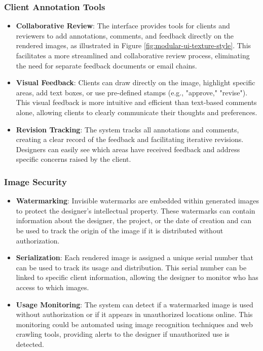 \documentclass[12pt]{report}
\begin{document}
\subsubsection{Client Annotation Tools}
\begin{itemize}
\item \textbf{Collaborative Review}: The interface provides tools for clients and reviewers to add annotations, comments, and feedback directly on the rendered images, as illustrated in Figure \ref{fig:modular-ui-texture-style}. This facilitates a more streamlined and collaborative review process, eliminating the need for separate feedback documents or email chains.
\item \textbf{Visual Feedback}: Clients can draw directly on the image, highlight specific areas, add text boxes, or use pre-defined stamps (e.g., "approve," "revise"). This visual feedback is more intuitive and efficient than text-based comments alone, allowing clients to clearly communicate their thoughts and preferences.
\item \textbf{Revision Tracking}: The system tracks all annotations and comments, creating a clear record of the feedback and facilitating iterative revisions. Designers can easily see which areas have received feedback and address specific concerns raised by the client.
\end{itemize}


\subsubsection{Image Security}
\begin{itemize}
\item \textbf{Watermarking}: Invisible watermarks are embedded within generated images to protect the designer's intellectual property. These watermarks can contain information about the designer, the project, or the date of creation and can be used to track the origin of the image if it is distributed without authorization.
\item \textbf{Serialization}: Each rendered image is assigned a unique serial number that can be used to track its usage and distribution. This serial number can be linked to specific client information, allowing the designer to monitor who has access to which images.
\item \textbf{Usage Monitoring}: The system can detect if a watermarked image is used without authorization or if it appears in unauthorized locations online. This monitoring could be automated using image recognition techniques and web crawling tools, providing alerts to the designer if unauthorized use is detected.
\end{itemize}
\end{document}

